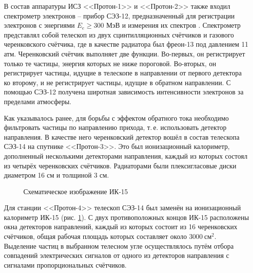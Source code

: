 \documentclass[12pt,a4paper]{report} %
\begin{document}
В состав аппаратуры ИСЗ <<Протон-1>> и <<Протон-2>> также входил спектрометр электронов – прибор СЭЗ-12, предназначенный для регистрации электронов с энергиями $E_e \geq 300$ МэВ и измерения их спектров \cite{SEZ12}. Спектрометр представлял собой телескоп из двух сцинтилляционных счётчиков и газового черенковского счётчика, где в качестве радиатора был фреон-13 под давлением 11 атм. Черенковский счётчик выполняет две функции. Во-первых, он регистрирует только те частицы, энергия которых не ниже пороговой. Во-вторых, он регистрирует частицы, идущие в телескопе в направлении от первого детектора ко второму, и не регистрирует частицы, идущие в обратном направлении. С помощью СЭЗ-12 получена широтная зависимость интенсивности электронов за пределами атмосферы. 

Как указывалось ранее, для борьбы с эффектом обратного тока необходимо фильтровать частицы по направлению прихода, т.\,е. использовать детектор направления. В качестве него черенковский детектор вошёл в состав телескопа СЭЗ-14  на спутнике <<Протон-3>>. Это был ионизационный калориметр, дополненный несколькими детекторами направления, каждый из которых состоял из четырёх черенковских счётчиков. Радиаторами были плексигласовые диски диаметром 16 см и толщиной 3 см. 
\begin{figure}[th]
	\noindent{}
	\caption{Схематическое изображение ИК-15}
	\label{picIK15}
\end{figure}
Для станции <<Протон-4>> телескоп СЭЗ-14 был заменён на ионизационный калориметр ИК-15 (рис. \ref{picIK15}). С двух противоположных концов ИК-15 расположены окна детекторов направлений, каждый из которых состоит из 16 черенковских счётчиков, общая рабочая площадь которых составляет около $3000~см^2$. Выделение частиц в выбранном телесном угле осуществлялось путём отбора совпадений электрических сигналов от одного из детекторов направления с сигналами пропорциональных счётчиков.
\end{document}
